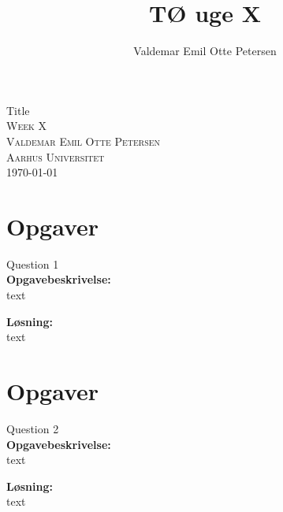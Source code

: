 \documentclass{article}
\author{Valdemar Emil Otte Petersen}
\title{TØ uge X}
\begin{document}
\begingroup

\centering 
{\LARGE Title}\\ %
\vspace*{1\baselineskip}
\scshape
Week X\\ %
Valdemar Emil Otte Petersen\\ %
{\small Aarhus Universitet}\\ 
{\small \today}

\endgroup

\section{Opgaver}
{\LARGE Question 1}\\

\textbf{Opgavebeskrivelse:}\\
text

\vspace{15px}
\textbf{Løsning:}\\
text

\vspace{35px}
\section{Opgaver}
{\LARGE Question 2}\\

\textbf{Opgavebeskrivelse:}\\
text

\vspace{15px}
\textbf{Løsning:}\\
text
\end{document}
